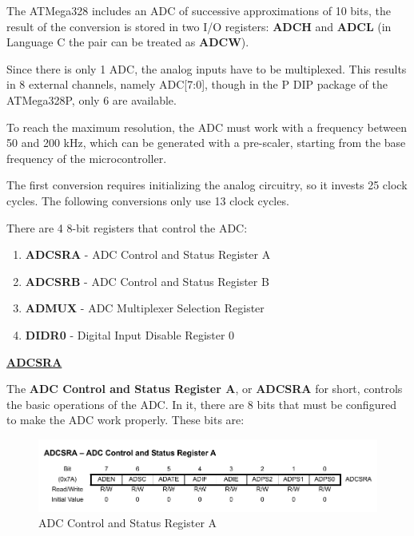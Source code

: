 The ATMega328 includes an ADC of successive approximations of 10 bits, the result of the conversion is stored in two I/O registers: \textbf{ADCH} and \textbf{ADCL} (in Language C the pair can be treated as \textbf{ADCW}).\medskip

Since there is only 1 ADC, the analog inputs have to be multiplexed. This results in 8 external channels, namely ADC[7:0], though in the P DIP package of the ATMega328P, only 6 are available.\medskip

To reach the maximum resolution, the ADC must work with a frequency between 50 and 200 kHz, which can be generated with a pre-scaler, starting from the base frequency of the microcontroller.\medskip

The first conversion requires initializing the analog circuitry, so it invests 25 clock cycles. The following conversions only use 13 clock cycles.\medskip

There are 4 8-bit registers that control the ADC:

\begin{enumerate}
    \item \textbf{ADCSRA} - ADC Control and Status Register A
    \item \textbf{ADCSRB} - ADC Control and Status Register B
    \item \textbf{ADMUX}  - ADC Multiplexer Selection Register
    \item \textbf{DIDR0}  - Digital Input Disable Register 0
\end{enumerate}

\medskip
\underline{\textbf{ADCSRA}}
\medskip

The \textbf{ADC Control and Status Register A}, or \textbf{ADCSRA} for short, controls the basic operations of the ADC. In it, there are 8 bits that must be configured to make the ADC work properly. These bits are:

\begin{figure}[H]
    \centering
    \includegraphics[width = \textwidth]{Graphics/MICROS/Practice 3/DATASHEET/ADCSRA.pdf}
    \caption{ADC Control and Status Register A~\autocite{ATMEGA328P}}
    \label{fig:ADCSRA}
\end{figure}


